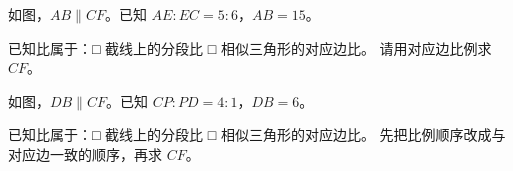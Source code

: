 \documentclass{exam-zh}
\begin{document}
\begin{problem}[points=10]
  \noindent
  \begin{minipage}[t]{\dimexpr\linewidth-60mm-6mm\relax}
    \vspace{0pt}
    如图，$AB\parallel CF$。已知 $AE:EC=5:6$，$AB=15$。

已知比属于：\quad □ 截线上的分段比 \quad □ 相似三角形的对应边比。
请用对应边比例求 $CF$。


  \end{minipage}\hfill
  \begin{diagramcoltikz}{60mm}{第 3 题图}
  }
  \end{diagramcoltikz}
  \par\medskip
  \answerarea[33mm]
\end{problem}



\begin{problem}[points=10]
  \noindent
  \begin{minipage}[t]{\dimexpr\linewidth-60mm-6mm\relax}
    \vspace{0pt}
    如图，$DB\parallel CF$。已知 $CP:PD=4:1$，$DB=6$。

已知比属于：\quad □ 截线上的分段比 \quad □ 相似三角形的对应边比。
先把比例顺序改成与对应边一致的顺序，再求 $CF$。


  \end{minipage}\hfill
  \begin{diagramcoltikz}{60mm}{第 4 题图}
  }
  \end{diagramcoltikz}
  \par\medskip
  \answerarea[33mm]
\end{problem}
\end{document}
